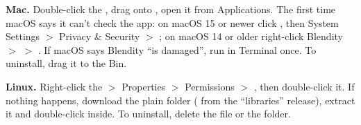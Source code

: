 \textbf{Mac.} Double-click the , drag  onto , open it from Applications. The
first time macOS says it can't check the app: on macOS 15 or newer click , then System Settings $>$ Privacy \&
Security $>$ ; on macOS 14 or older right-click Blendity $>$  $>$ . If macOS says
Blendity ``is damaged'', run  in Terminal once. To
uninstall, drag it to the Bin.

\textbf{Linux.} Right-click the  $>$ Properties $>$ Permissions $>$ ,
then double-click it. If nothing happens, download the plain folder ( from the
``libraries'' release), extract it and double-click  inside. To uninstall, delete the file or the folder.


